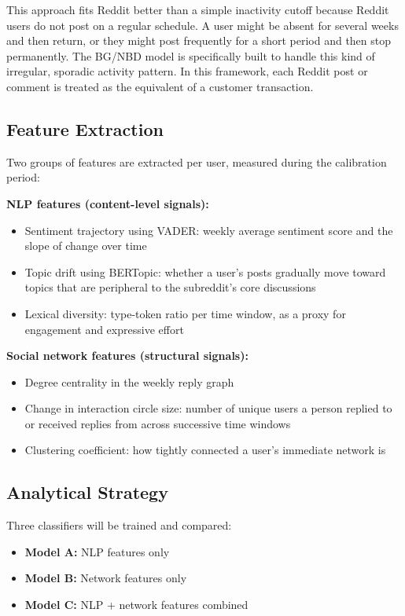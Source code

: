 \documentclass[12pt]{article}
\begin{document}
This approach fits Reddit better than a simple inactivity cutoff because Reddit users do not post on a regular schedule. A user might be absent for several weeks and then return, or they might post frequently for a short period and then stop permanently. The BG/NBD model is specifically built to handle this kind of irregular, sporadic activity pattern. In this framework, each Reddit post or comment is treated as the equivalent of a customer transaction.

\subsection*{Feature Extraction}

Two groups of features are extracted per user, measured during the calibration period:

\textbf{NLP features (content-level signals):}
\begin{itemize}
    \item Sentiment trajectory using VADER: weekly average sentiment score and the slope of change over time
    \item Topic drift using BERTopic: whether a user's posts gradually move toward topics that are peripheral to the subreddit's core discussions
    \item Lexical diversity: type-token ratio per time window, as a proxy for engagement and expressive effort
\end{itemize}

\textbf{Social network features (structural signals):}
\begin{itemize}
    \item Degree centrality in the weekly reply graph
    \item Change in interaction circle size: number of unique users a person replied to or received replies from across successive time windows
    \item Clustering coefficient: how tightly connected a user's immediate network is
\end{itemize}

\subsection*{Analytical Strategy}

Three classifiers will be trained and compared:

\begin{itemize}
    \item \textbf{Model A:} NLP features only
    \item \textbf{Model B:} Network features only
    \item \textbf{Model C:} NLP + network features combined
\end{itemize}
\end{document}
